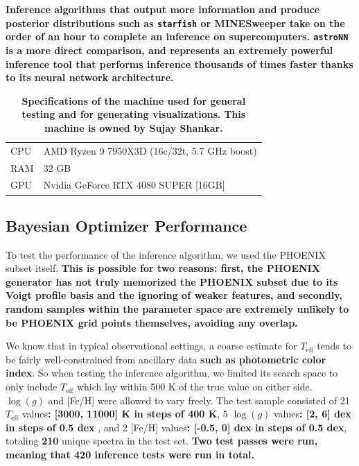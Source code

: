 \documentclass[twocolumn, linenumbers]{aastex631}
\begin{document}
\textbf{Inference algorithms that output more information and produce posterior distributions such as \texttt{starfish} \citep{starfish} or MINESweeper \citep{minesweeper} take on the order of an hour to complete an inference on supercomputers.
\texttt{astroNN} \citep{leung2019} is a more direct comparison, and represents an extremely powerful inference tool that performs inference thousands of times faster thanks to its neural network architecture.}
\begin{table}[h!]
    \centering
    \begin{tabular}{ll}
        \hline
        CPU & AMD Ryzen 9 7950X3D (16c/32t, 5.7 GHz boost)\\
        RAM & 32 GB\\
        GPU & Nvidia GeForce RTX 4080 SUPER [16GB]\\
        \hline
    \end{tabular}
    \caption{\textbf{Specifications of the machine used for general testing and for generating visualizations.}
    \textbf{This machine is owned by Sujay Shankar.}}
    \label{tab:table3}
\end{table}

\subsection{Bayesian Optimizer Performance}
To test the performance of the inference algorithm, we used the PHOENIX subset itself.
\textbf{This is possible for two reasons: first, the PHOENIX generator has not truly memorized the PHOENIX subset due to its Voigt profile basis and the ignoring of weaker features, and secondly, random samples within the parameter space are extremely unlikely to be PHOENIX grid points themselves, avoiding any overlap.}

We know that in typical observational settings, a coarse estimate for $T_{\mathrm{eff}}$ tends to be fairly well-constrained from ancillary data \textbf{such as photometric color index}.
So when testing the inference algorithm, we limited its search space to only include $T_{\mathrm{eff}}$ which lay within 500 K of the true value on either side.
$\log(g)$ and [Fe/H] were allowed to vary freely.
The test sample consisted of 21 $T_{\mathrm{eff}}$ values\textbf{: [3000, 11000] K in steps of 400 K}, 5 $\log(g)$ values\textbf{: [2, 6] dex in steps of 0.5 dex} , and 2 [Fe/H] values\textbf{: [-0.5, 0] dex in steps of 0.5 dex}, totaling \textbf{210} unique spectra in the test set.
\textbf{Two test passes were run, meaning that 420 inference tests were run in total.}
\end{document}
